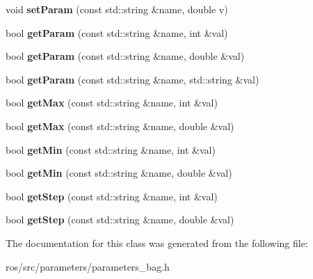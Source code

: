 \begin{DoxyCompactItemize}
\item 
\hypertarget{classParameterBag_ab862e0710eb048d59fff94cce04056af}{
void {\bfseries setParam} (const std::string \&name, double v)}
\label{classParameterBag_ab862e0710eb048d59fff94cce04056af}

\item 
\hypertarget{classParameterBag_a57d7a5cad5c90a8532cd93f61eefc37f}{
bool {\bfseries getParam} (const std::string \&name, int \&val)}
\label{classParameterBag_a57d7a5cad5c90a8532cd93f61eefc37f}

\item 
\hypertarget{classParameterBag_a8803c44d95e9341f3e9e746dcb71c06e}{
bool {\bfseries getParam} (const std::string \&name, double \&val)}
\label{classParameterBag_a8803c44d95e9341f3e9e746dcb71c06e}

\item 
\hypertarget{classParameterBag_a1b5b8dd08eef223b17333dbc982caea3}{
bool {\bfseries getParam} (const std::string \&name, std::string \&val)}
\label{classParameterBag_a1b5b8dd08eef223b17333dbc982caea3}

\item 
\hypertarget{classParameterBag_a2b0507694ac0f2606aec122621aa01ff}{
bool {\bfseries getMax} (const std::string \&name, int \&val)}
\label{classParameterBag_a2b0507694ac0f2606aec122621aa01ff}

\item 
\hypertarget{classParameterBag_a0db46a3c07d31177be78eba42f1b741d}{
bool {\bfseries getMax} (const std::string \&name, double \&val)}
\label{classParameterBag_a0db46a3c07d31177be78eba42f1b741d}

\item 
\hypertarget{classParameterBag_ab6521af4306ac281dfc92f9abc17f41d}{
bool {\bfseries getMin} (const std::string \&name, int \&val)}
\label{classParameterBag_ab6521af4306ac281dfc92f9abc17f41d}

\item 
\hypertarget{classParameterBag_ad25c1fae4a2049a1006d4b0c5eb13733}{
bool {\bfseries getMin} (const std::string \&name, double \&val)}
\label{classParameterBag_ad25c1fae4a2049a1006d4b0c5eb13733}

\item 
\hypertarget{classParameterBag_ad9c3ffc8b8cffe53196df06e34fdb1bf}{
bool {\bfseries getStep} (const std::string \&name, int \&val)}
\label{classParameterBag_ad9c3ffc8b8cffe53196df06e34fdb1bf}

\item 
\hypertarget{classParameterBag_aeb4a3e10ed52ff77d94d6a135a150be6}{
bool {\bfseries getStep} (const std::string \&name, double \&val)}
\label{classParameterBag_aeb4a3e10ed52ff77d94d6a135a150be6}

\end{DoxyCompactItemize}


The documentation for this class was generated from the following file:\begin{DoxyCompactItemize}
\item 
ros/src/parameters/parameters\_\-bag.h\end{DoxyCompactItemize}
